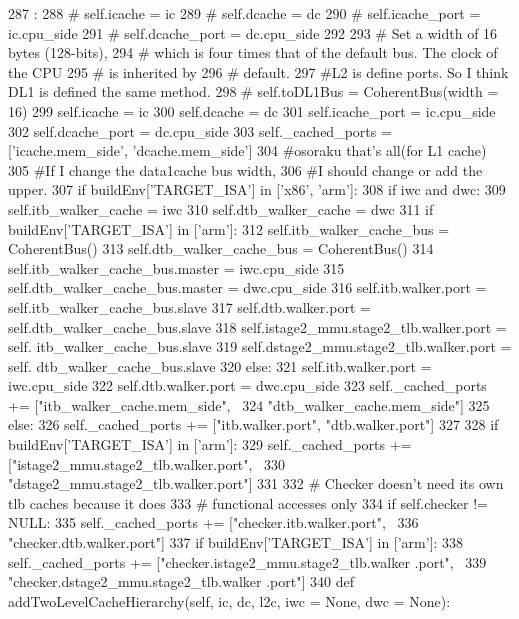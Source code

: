 \begin{DoxyCode}
287                                                                      :
288 #        self.icache = ic
289 #        self.dcache = dc
290 #        self.icache_port = ic.cpu_side
291 #        self.dcache_port = dc.cpu_side
292 
293         # Set a width of 16 bytes (128-bits), 
294         # which is four times that of the default bus. The clock of the CPU 
295         # is inherited by
296         # default.
297         #L2 is define ports. So I think DL1 is defined the same method. 
298 #        self.toDL1Bus = CoherentBus(width = 16)
299         self.icache = ic
300         self.dcache = dc
301         self.icache_port = ic.cpu_side
302         self.dcache_port = dc.cpu_side
303         self._cached_ports = ['icache.mem_side', 'dcache.mem_side']
304         #osoraku that's all(for L1 cache)
305         #If I change the data1cache bus width, 
306         #I should change or add the upper.
307         if buildEnv['TARGET_ISA'] in ['x86', 'arm']:
308             if iwc and dwc:
309                 self.itb_walker_cache = iwc
310                 self.dtb_walker_cache = dwc
311                 if buildEnv['TARGET_ISA'] in ['arm']:
312                     self.itb_walker_cache_bus = CoherentBus()
313                     self.dtb_walker_cache_bus = CoherentBus()
314                     self.itb_walker_cache_bus.master = iwc.cpu_side
315                     self.dtb_walker_cache_bus.master = dwc.cpu_side
316                     self.itb.walker.port = self.itb_walker_cache_bus.slave
317                     self.dtb.walker.port = self.dtb_walker_cache_bus.slave
318                     self.istage2_mmu.stage2_tlb.walker.port = self.
      itb_walker_cache_bus.slave
319                     self.dstage2_mmu.stage2_tlb.walker.port = self.
      dtb_walker_cache_bus.slave
320                 else:
321                     self.itb.walker.port = iwc.cpu_side
322                     self.dtb.walker.port = dwc.cpu_side
323                 self._cached_ports += ["itb_walker_cache.mem_side", \
324                                        "dtb_walker_cache.mem_side"]
325             else:
326                 self._cached_ports += ["itb.walker.port", "dtb.walker.port"]
327 
328                 if buildEnv['TARGET_ISA'] in ['arm']:
329                     self._cached_ports += ["istage2_mmu.stage2_tlb.walker.port", 
      \
330                                            "dstage2_mmu.stage2_tlb.walker.port"]
331 
332             # Checker doesn't need its own tlb caches because it does
333             # functional accesses only
334             if self.checker != NULL:
335                 self._cached_ports += ["checker.itb.walker.port", \
336                                        "checker.dtb.walker.port"]
337                 if buildEnv['TARGET_ISA'] in ['arm']:
338                     self._cached_ports += ["checker.istage2_mmu.stage2_tlb.walker
      .port", \
339                                            "checker.dstage2_mmu.stage2_tlb.walker
      .port"]
340 
    def addTwoLevelCacheHierarchy(self, ic, dc, l2c, iwc = None, dwc = None):
\end{DoxyCode}
